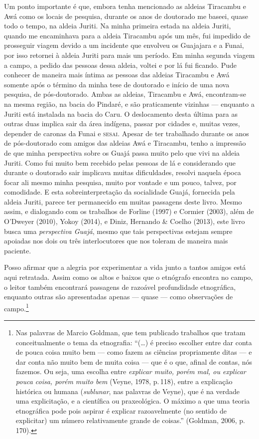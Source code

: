Um ponto importante é que, embora tenha mencionado as aldeias
Tiracambu e Awá como os locais de pesquisa, durante os anos de doutorado
me baseei, quase todo o tempo, na aldeia Juriti. Na minha primeira
estada na aldeia Juriti, quando me encaminhava
para a aldeia Tiracambu após um mês, fui impedido de prosseguir viagem devido a um
incidente que envolveu os Guajajara e a Funai, por isso retornei à
aldeia Juriti para mais um período. Em minha segunda viagem a campo, a
pedido das pessoas dessa aldeia, voltei e por lá fui ficando.
Pude conhecer de maneira mais íntima as pessoas das aldeias Tiracambu e Awá somente
após o término da minha tese de doutorado e início de uma nova pesquisa,
de pós-doutorado. Ambas as aldeias, Tiracambu e Awá, encontram-se na
mesma região, na bacia do Pindaré, e são praticamente vizinhas --- enquanto
a Juriti está instalada na bacia do Caru. O deslocamento desta última
para as outras duas implica sair da área indígena, passar por cidades e,
muitas vezes, depender de caronas da Funai e \textsc{sesai}. Apesar de ter
trabalhado durante os anos de pós-doutorado com amigos das aldeias Awá
e Tiracambu, tenho a impressão de que minha perspectiva sobre os Guajá
passa muito pelo que vivi na aldeia Juriti. Como fui muito bem recebido
pelas pessoas de lá e considerando que durante o doutorado sair
implicava muitas dificuldades, resolvi naquela época focar ali mesmo
minha pesquisa, muito por vontade e um pouco, talvez, por comodidade. E
esta sobreinterpretação da socialidade Guajá, fornecida pela aldeia
Juriti, parece ter permanecido em muitas passagens deste livro. Mesmo
assim, e dialogando com os trabalhos de Forline (1997) e Cormier (2003),
além de O'Dweyer (2010), Yokoy (2014), e Diniz, Hernando \& Coelho
(2013), este livro busca uma \textit{perspectiva Guajá}, mesmo que tais
perspectivas estejam sempre apoiadas nos dois ou três interlocutores que
nos toleram de maneira mais paciente.

Posso afirmar que a alegria por experimentar a vida junto a tantos
amigos está aqui retratada. Assim como os altos e baixos que o etnógrafo
encontra no campo, o leitor também encontrará passagens de razoável
profundidade etnográfica, enquanto outras são apresentadas apenas ---
quase --- como observações de campo.\footnote{Nas palavras de Marcio
  Goldman, que tem publicado trabalhos que tratam conceitualmente o tema
  da etnografia: ``(\ldots{}) é preciso escolher entre dar conta de pouca
  coisa muito bem --- como fazem as ciências propriamente ditas --- e dar
  conta não muito bem de muita coisa --- que é o que, afinal de contas,
  nós fazemos. Ou seja, uma escolha entre \textit{explicar muito, porém mal,
  ou explicar pouca coisa, porém muito bem} (Veyne, 1978, p.\,118), entre a
  explicação histórica ou humana (\textit{sublunar}, nas palavras de Veyne),
  que é na verdade uma explicitação, e a científica ou praxeológica. O
  máximo a que uma teoria etnográfica pode pois aspirar é explicar
  razoavelmente (no sentido de explicitar) um número relativamente
  grande de coisas.'' (Goldman, 2006, p.\,170).} %


